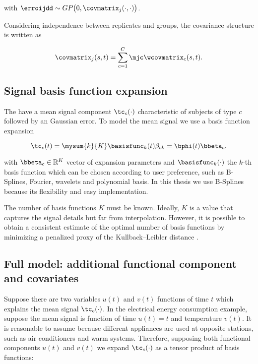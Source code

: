 \noindent with $\erroijdd \sim GP \bigl( 0, \covmatrix_j(\cdot,\cdot)\bigr)$.

Considering independence between replicates and groups, the covariance structure is written as

\begin{equation}
  \label{eq:sigma}
   \covmatrix_j(s,t) = \sum_{c=1}^C \mjc \wcovmatrix_c(s,t).
\end{equation}


\subsection{Signal basis function expansion}

The  have a mean signal component $\tc_c(\cdot)$ characteristic of subjects of type $c$ followed by an Gaussian error. To model the mean signal we use a basis function expansion

\begin{equation}
  \tc_c(t) = \mysum{k}{K} \basisfunc_k(t) \beta_{ck} = \bphi(t) \bbeta_c,
  \label{eq:alphaexpansion}
\end{equation}

\noindent with $\bbeta_c \in \mathbb{R}^K$ vector of expansion parameters and $\basisfunc_k(\cdot)$ the $k$-th basis function which can be chosen according to user preference, such as B-Splines, Fourier, wavelets and polynomial basis. In this thesis we use B-Splines because its flexibility and easy implementation. 

The number of basis functions $K$ must be known. Ideally, $K$ is a value that captures the signal details but far from interpolation. However, it is possible to obtain a consistent estimate of the optimal number of basis functions by minimizing a penalized proxy of the Kullback–Leibler distance \cite{dias2007consistent}.

\subsection{Full model: additional functional component and covariates}
\label{sec:method-fm}

Suppose there are two variables $u(t)$ and $v(t)$ functions of time $t$ which explains the mean signal $\tc_c(\cdot)$. In the electrical energy consumption example, suppose the mean signal is function of time $u(t) =t$ and temperature $v(t)$. It is reasonable to assume because different appliances are used at opposite stations, such as air conditioners and warm systems. Therefore, supposing both functional components $u(t)$ and $v(t)$ we expand $\tc_c(\cdot)$ as a tensor product of basis functions:

